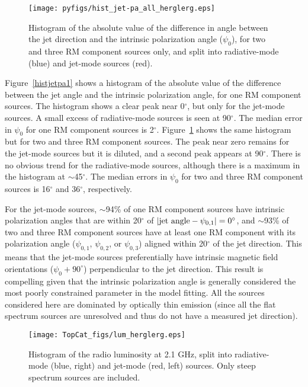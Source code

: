 \documentclass{mnras}
\begin{document}
\begin{figure} 
\centering
    \texttt{[image: pyfigs/hist\_jet-pa\_all\_herglerg.eps]} 
    \caption{ {\small Histogram of the absolute value of the difference in angle between the jet direction and the intrinsic polarization angle ($\psi_0$), 
    for two and three RM component sources only, and split into radiative-mode (blue) and jet-mode sources (red). } }
    \label{histjetpa23}
\end{figure} 

Figure~\ref{histjetpa1} shows a histogram of the absolute value of the difference between the jet angle and the intrinsic polarization angle, for one RM component sources. 
The histogram shows a clear peak near 0$^\circ$, but only for the jet-mode sources. A small excess of radiative-mode sources is seen at 90$^\circ$. The median error in $\psi_0$ for one RM component sources is 2$^\circ$.
Figure~\ref{histjetpa23} shows the same histogram but for two and three RM component sources. The peak near zero remains for the jet-mode sources but it is diluted, and a second peak appears at 90$^\circ$. There is no obvious trend for the radiative-mode sources, although there is a maximum in the histogram at $\sim$45$^\circ$. The median errors in $\psi_0$ for two and three RM component sources is 16$^\circ$ and 36$^\circ$, respectively.

For the jet-mode sources, $\sim$94\% of one RM component sources have intrinsic polarization angles that are within 20$^\circ$ of $|{\rm jet\,\,angle}-\psi_{0,1}|=0^\circ$, and $\sim$93\% of two and three RM component sources have at least one RM component with its polarization angle ($\psi_{0,1}$, $\psi_{0,2}$, or $\psi_{0,3}$) aligned within 20$^\circ$ of the jet direction. 
This means that the jet-mode sources preferentially have intrinsic magnetic field orientations ($\psi_{0}+90^\circ$) perpendicular to the jet direction. This result is compelling given that the intrinsic polarization angle is generally considered the most poorly constrained parameter in the model fitting. 
All the sources considered here are dominated by optically thin emission (since all the flat spectrum sources are unresolved and thus do not have a measured jet direction). 

\begin{figure} 
\centering
    \texttt{[image: TopCat\_figs/lum\_herglerg.eps]} 
    \caption{ {\small Histogram of the radio luminosity at 2.1 GHz, split into radiative-mode (blue, right) and jet-mode (red, left) sources. 
    Only steep spectrum sources are included. } }
    \label{lumherglerg}
\end{figure} 
\end{document}
